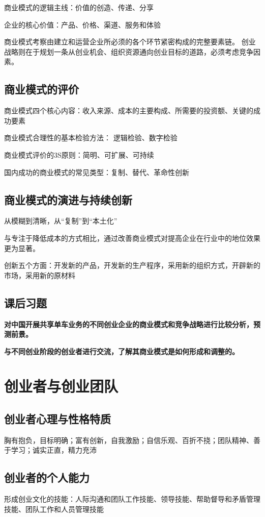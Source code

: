 \documentclass[a4paper, UTF8]{ctexart}
\begin{document}
		商业模式的逻辑主线：价值的创造、传递、分享

		企业的核心价值：产品、价格、渠道、服务和体验

		商业模式考察由建立和运营企业所必须的各个环节紧密构成的完整要素链。
		创业战略则在于规划一条从创业机会、组织资源通向创业目标的道路，必须考虑竞争因素。

	\subsection{商业模式的评价}
		商业模式四个核心内容：收入来源、成本的主要构成、所需要的投资额、关键的成功要素

		商业模式合理性的基本检验方法：
		逻辑检验、数字检验

		商业模式评价的3S原则：简明、可扩展、可持续

		国内成功的商业模式的常见类型：复制、替代、革命性创新

	\subsection{商业模式的演进与持续创新}
		从模糊到清晰，从“复制”到“本土化”

		与专注于降低成本的方式相比，通过改善商业模式对提高企业在行业中的地位效果更为显著。

		创新五个方面：开发新的产品，开发新的生产程序，采用新的组织方式，开辟新的市场，采用新的原材料

	\subsection{课后习题}
		\textbf{对中国开展共享单车业务的不同创业企业的商业模式和竞争战略进行比较分析，预测前景。}

		\textbf{与不同创业阶段的创业者进行交流，了解其商业模式是如何形成和调整的。}

\section{创业者与创业团队}
	\subsection{创业者心理与性格特质}
		胸有抱负，目标明确；富有创新，自我激励；自信乐观、百折不挠；团队精神、善于学习；诚实正直，精力充沛

	\subsection{创业者的个人能力}
		形成创业文化的技能：人际沟通和团队工作技能、领导技能、帮助督导和矛盾管理技能、团队工作和人员管理技能
		
\end{document}
